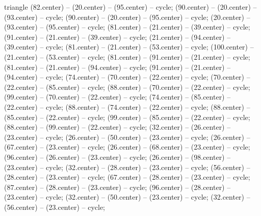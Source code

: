 {\begin{pgfonlayer}{triangle}
 (82.center) -- (20.center) -- (95.center) -- cycle; 
 (90.center) -- (20.center) -- (93.center) -- cycle; 
 (90.center) -- (20.center) -- (95.center) -- cycle; 
 (20.center) -- (93.center) -- (95.center) -- cycle; 
 (81.center) -- (21.center) -- (39.center) -- cycle; 
 (91.center) -- (21.center) -- (39.center) -- cycle; 
 (21.center) -- (94.center) -- (39.center) -- cycle; 
 (81.center) -- (21.center) -- (53.center) -- cycle; 
 (100.center) -- (21.center) -- (53.center) -- cycle; 
 (81.center) -- (91.center) -- (21.center) -- cycle; 
 (81.center) -- (21.center) -- (94.center) -- cycle; 
 (91.center) -- (21.center) -- (94.center) -- cycle; 
 (74.center) -- (70.center) -- (22.center) -- cycle; 
 (70.center) -- (22.center) -- (85.center) -- cycle; 
 (88.center) -- (70.center) -- (22.center) -- cycle; 
 (99.center) -- (70.center) -- (22.center) -- cycle; 
 (74.center) -- (85.center) -- (22.center) -- cycle; 
 (88.center) -- (74.center) -- (22.center) -- cycle; 
 (88.center) -- (85.center) -- (22.center) -- cycle; 
 (99.center) -- (85.center) -- (22.center) -- cycle; 
 (88.center) -- (99.center) -- (22.center) -- cycle; 
 (32.center) -- (26.center) -- (23.center) -- cycle; 
 (26.center) -- (50.center) -- (23.center) -- cycle; 
 (26.center) -- (67.center) -- (23.center) -- cycle; 
 (26.center) -- (68.center) -- (23.center) -- cycle; 
 (96.center) -- (26.center) -- (23.center) -- cycle; 
 (26.center) -- (98.center) -- (23.center) -- cycle; 
 (32.center) -- (28.center) -- (23.center) -- cycle; 
 (56.center) -- (28.center) -- (23.center) -- cycle; 
 (67.center) -- (28.center) -- (23.center) -- cycle; 
 (87.center) -- (28.center) -- (23.center) -- cycle; 
 (96.center) -- (28.center) -- (23.center) -- cycle; 
 (32.center) -- (50.center) -- (23.center) -- cycle; 
 (32.center) -- (56.center) -- (23.center) -- cycle; 

\end{pgfonlayer}}
